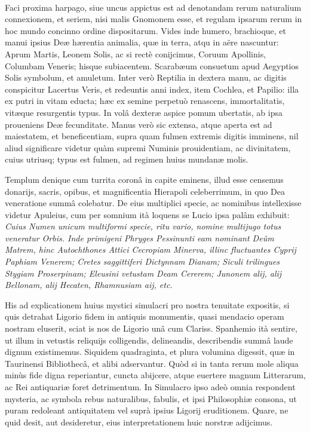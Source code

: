 \documentclass[a4paper, 11pt, oneside, polutonikogreek, latin]{article}
\begin{document}
\paragraph{}
Faci proxima harpago, siue uncus appictus est ad denotandam rerum naturalium connexionem, et seriem, nisi malis Gnomonem esse, et regulam ipsarum rerum in hoc mundo concinno ordine dispositarum. Vides inde humero, brachioque, et manui ipsius Deæ hærentia animalia, quæ in terra, atqu in aëre nascuntur: Aprum Martis, Leonem Solis, ac si rectè conijcimus, Coruum Apollinis, Columbam Veneris; hisque subiacentem. Scarabæum consuetum apud Aegyptios Solis symbolum, et amuletum. Inter verò Reptilia in dextera manu, ac digitis conspicitur Lacertus Veris, et redeuntis anni index, item Cochlea, et Papilio: illa ex putri in vitam educta; hæc ex semine perpetuò renascens, immortalitatis, vitæque resurgentis typus. In volâ dexteræ aspice pomum ubertatis, ab ipsa proueniens Deæ fecunditate. Manus verò sic extensa, atque aperta est ad maiestatem, et beneficentiam, supra quam fulmen extremis digitis imminens, nil aliud significare videtur quàm supremi Numinis prouidentiam, ac divinitatem, cuius utriusq; typus est fulmen, ad regimen huius mundanæ molis.

Templum denique cum turrita coronâ in capite eminens, illud esse censemus donarijs, sacris, opibus, et magnificentia Hierapoli celeberrimum, in quo Dea veneratione summâ colebatur. De eius multiplici specie, ac nominibus intellexisse videtur Apuleius, cum per somnium ità loquens se Lucio ipsa palâm exhibuit: \emph{Cuius Numen unicum multiformi specie, ritu vario, nomine multijugo totus veneratur Orbis. Inde primigeni Phryges Pessinunti eam nominant Deûm Matrem, hinc Autochthones Attici Cecropiam Minerva, illinc fluctuantes Cyprij Paphiam Venerem; Cretes saggittiferi Dictynnam Dianam; Siculi trilingues Stygiam Proserpinam; Eleusini vetustam Deam Cererem; Junonem alij, alij Bellonam, alij Hecaten, Rhamnusiam aij, etc.}

His ad explicationem huius mystici simulacri pro nostra tenuitate expositis, si quis detrahat Ligorio fidem in antiquis monumentis, quasi mendacio operam nostram eluserit, sciat is nos de Ligorio unâ cum Clariss. Spanhemio ità sentire, ut illum in vetustis reliquijs colligendis, delineandis, describendis summâ laude dignum existimemus. Siquidem quadraginta, et plura volumina digessit, quæ in Taurinensi Bibliothecâ, et alibi adservantur. Quòd si in tanta rerum mole aliqua minùs fide digna reperiantur, cuncta abijcere, atque euertere magnum Litterarum, ac Rei antiquariæ foret detrimentum. In Simulacro ipso adeò omnia respondent mysteria, ac symbola rebus naturalibus, fabulis, et ipsi Philosophiæ consona, ut puram redoleant antiquitatem vel suprà ipsius Ligorij eruditionem. Quare, ne quid desit, aut desideretur, eius interpretationem huic norstræ adijcimus.
\clearpage
\end{document}
